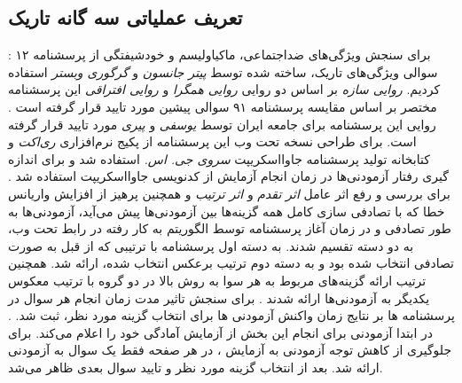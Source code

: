 \subsection{تعریف عملیاتی سه گانه تاریک}
:
برای سنجش ویژگی‌های ضداجتماعی، ماکیاولیسم و خودشیفتگی از پرسشنامه ۱۲ سوالی ویژگی‌های تاریک، ساخته شده توسط
\textit{
    پیتر جانسون }
و
\textit{
    گرگوری وبستر}
استفاده کردیم.
\!\citep{jonasonDirtyDozenConcise2010}
\textit{
    روایی سازه
}
بر اساس دو روایی
\textit{
    روایی همگرا
}
و
\textit{
    روایی افتراقی
}
این پرسشنامه مختصر بر اساس مقایسه پرسشنامه ۹۱ سوالی پیشین مورد تایید قرار گرفته است
\!\citep{jonasonDirtyDozenConcise2010}
\!.
روایی این پرسشنامه برای جامعه ایران توسط
\textit{
    یوسفی
}
و
\textit{
    پیری
}
\!\citep{ywsfyWyjgyHyRwn2016}
مورد تایید قرار گرفته است.
برای طراحی نسخه تحت وب این پرسشنامه از پکیج نرم‌افزاری
\textit{
    ری‌اکت
}
و کتابخانه تولید پرسشنامه جاوااسکریپت
\textit{
    سروی جی. اس.
}
استفاده شد و برای اندازه گیری رفتار آزمودنی‌ها در زمان انجام آزمایش از کدنویسی جاوااسکریپت استفاده شد
\!.
برای بررسی و رفع اثر عامل
\textit{
    اثر تقدم
}
و
\textit{
    اثر ترتیب
}
\!\citep{dillmanMultipleAnswerQuestions2003,krosnickEVALUATIONCOGNITIVETHEORY1987,leeEffectQuestionOrder2009}
و همچنین پرهیز از افزایش واریانس خطا که
با تصادفی سازی کامل همه گزینه‌ها بین آزمودنی‌ها پیش می‌آید،
\!\citep{dillmanMultipleAnswerQuestions2003}
آزمودنی‌ها به طور تصادفی و در زمان آغاز پرسشنامه
توسط الگوریتم به کار رفته در رابط تحت وب، به دو دسته تقسیم
شدند. به دسته اول پرسشنامه با ترتیبی که از قبل به
صورت تصادفی انتخاب شده بود و به دسته دوم ترتیب برعکس  انتخاب شده،
ارائه شد. همچنین ترتیب
ارائه گزینه‌های مربوط به هر سوا به روش بالا در دو گروه با ترتیب معکوس یکدیگر به آزمودنی‌ها ارائه شدند
{\citep{dayOrderingEffectsChoice2012}}
{.}
برای سنجش تاثیر مدت زمان انجام هر سوال در پرسشنامه ها
بر نتایج زمان واکنش  آزمودنی ها برای انتخاب گزینه مورد نظر،
ثبت شد.
{\citep{malhotraCompletionTimeResponse2008}}
{.}
در ابتدا آزمودنی برای انجام این بخش از آزمایش آمادگی خود را اعلام می‌کند.
برای جلوگیری از کاهش توجه آزمودنی به آزمایش
\!\citep{meadeIdentifyingCarelessResponses2012}
،
در هر صفحه فقط یک سوال به آزمودنی ارائه شد.
بعد از انتخاب گزینه مورد نظر و تایید سوال بعدی ظاهر می‌شد.
